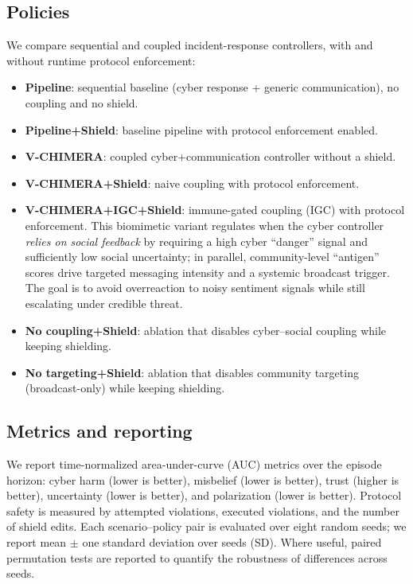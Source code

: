 \documentclass[biomimetics,article,submit,pdftex,moreauthors]{Definitions/mdpi}
\begin{document}
\subsection{Policies}
We compare sequential and coupled incident-response controllers, with and without runtime protocol enforcement:
\begin{itemize}[leftmargin=*]
  \item \textbf{Pipeline}: sequential baseline (cyber response + generic communication), no coupling and no shield.
  \item \textbf{Pipeline+Shield}: baseline pipeline with protocol enforcement enabled.
  \item \textbf{V-CHIMERA}: coupled cyber+communication controller without a shield.
  \item \textbf{V-CHIMERA+Shield}: naive coupling with protocol enforcement.
  \item \textbf{V-CHIMERA+IGC+Shield}: immune-gated coupling (IGC) with protocol enforcement. This biomimetic variant regulates when the cyber controller \emph{relies on social feedback} by requiring a high cyber ``danger'' signal and sufficiently low social uncertainty; in parallel, community-level ``antigen'' scores drive targeted messaging intensity and a systemic broadcast trigger. The goal is to avoid overreaction to noisy sentiment signals while still escalating under credible threat.
  \item \textbf{No coupling+Shield}: ablation that disables cyber--social coupling while keeping shielding.
  \item \textbf{No targeting+Shield}: ablation that disables community targeting (broadcast-only) while keeping shielding.
\end{itemize}

\subsection{Metrics and reporting}
We report time-normalized area-under-curve (AUC) metrics over the episode horizon: cyber harm (lower is better), misbelief (lower is better), trust (higher is better), uncertainty (lower is better), and polarization (lower is better).
Protocol safety is measured by attempted violations, executed violations, and the number of shield edits.
Each scenario--policy pair is evaluated over eight random seeds; we report mean $\pm$ one standard deviation over seeds (SD). Where useful, paired permutation tests are reported to quantify the robustness of differences across seeds.
\end{document}
